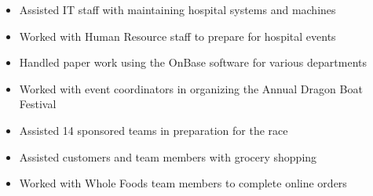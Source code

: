 \medskip


\medskip


\smallskip
\smallskip



\medskip


\begin{itemize}
  \item Assisted IT staff with maintaining hospital systems and machines
  \item Worked with Human Resource staff to prepare for hospital events
  \item Handled paper work using the OnBase software for various departments 
\end{itemize}

\divider

\begin{itemize}
  \item Worked with event coordinators in organizing the Annual Dragon Boat Festival
  \item Assisted 14 sponsored teams in preparation for the race
\end{itemize}

\divider

\begin{itemize}
  \item Assisted customers and team members with grocery shopping 
  \item Worked with Whole Foods team members to complete online orders
\end{itemize}

